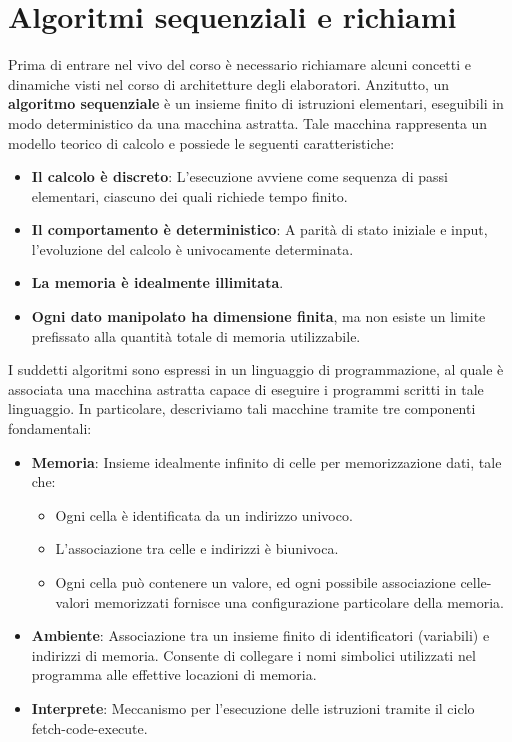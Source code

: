 \section{Algoritmi sequenziali e richiami}
Prima di entrare nel vivo del corso è necessario richiamare alcuni concetti e dinamiche visti nel corso di architetture degli elaboratori. Anzitutto, un \textbf{algoritmo sequenziale} è un insieme finito di istruzioni elementari, eseguibili in modo deterministico da una macchina astratta. Tale macchina rappresenta un modello teorico di calcolo e possiede le seguenti caratteristiche: \begin{itemize}
	\item \textbf{Il calcolo è discreto}: L’esecuzione avviene come sequenza di passi elementari, ciascuno dei quali richiede tempo finito.
	\item \textbf{Il comportamento è deterministico}: A parità di stato iniziale e input, l’evoluzione del calcolo è univocamente determinata.
	\item \textbf{La memoria è idealmente illimitata}.
	\item \textbf{Ogni dato manipolato ha dimensione finita}, ma non esiste un limite prefissato alla quantità totale di memoria utilizzabile.
\end{itemize}
\noindent I suddetti algoritmi sono espressi in un linguaggio di programmazione, al quale è associata una macchina astratta capace di eseguire i programmi scritti in tale linguaggio. In particolare, descriviamo tali macchine tramite tre componenti fondamentali: \begin{itemize}
	\item \textbf{Memoria}: Insieme idealmente infinito di celle per memorizzazione dati, tale che: \begin{itemize}
		\item Ogni cella è identificata da un indirizzo univoco.
		\item L’associazione tra celle e indirizzi è biunivoca.
		\item Ogni cella può contenere un valore, ed ogni possibile associazione celle-valori memorizzati fornisce una configurazione particolare della memoria.
	\end{itemize}
	\item \textbf{Ambiente}: Associazione tra un insieme finito di identificatori (variabili) e indirizzi di memoria. Consente di collegare i nomi simbolici utilizzati nel programma alle effettive locazioni di memoria.
	\item \textbf{Interprete}: Meccanismo per l'esecuzione delle istruzioni tramite il ciclo fetch-code-execute.
\end{itemize}

